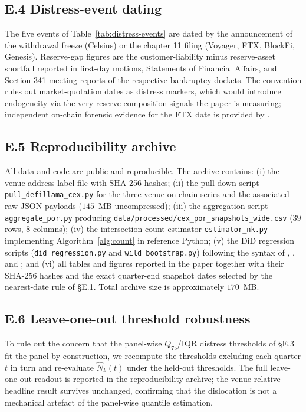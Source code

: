 \subsection*{E.4 Distress-event dating}

The five events of Table~\ref{tab:distress-events} are dated by
the announcement of the withdrawal freeze (Celsius) or the
chapter 11 filing (Voyager, FTX, BlockFi, Genesis).
Reserve-gap figures are the customer-liability minus reserve-asset
shortfall reported in first-day motions, Statements of Financial
Affairs, and Section 341 meeting reports of the respective
bankruptcy dockets. The convention rules out market-quotation
dates as distress markers, which would introduce endogeneity via
the very reserve-composition signals the paper is measuring;
independent on-chain forensic evidence for the FTX date is
provided by \citet{Griffin-Kruger-Mei2023}.

\subsection*{E.5 Reproducibility archive}

All data and code are public and reproducible. The archive
contains:
(i) the venue-address label file with SHA-256 hashes;
(ii) the pull-down script \texttt{pull\_defillama\_cex.py} for the
three-venue on-chain series and the associated raw JSON payloads
($145$~MB uncompressed);
(iii) the aggregation script \texttt{aggregate\_por.py} producing
\texttt{data/processed/cex\_por\_snapshots\_wide.csv} (39 rows,
8 columns);
(iv) the intersection-count estimator \texttt{estimator\_nk.py}
implementing Algorithm~\ref{alg:count} in reference Python;
(v) the DiD regression scripts (\texttt{did\_regression.py} and
\texttt{wild\_bootstrap.py}) following the syntax of
\citet{Callaway-SantAnna2021}, \citet{Sun-Abraham2021}, and
\citet{Borusyak2024}; and
(vi) all tables and figures reported in the paper together with
their SHA-256 hashes and the exact quarter-end snapshot dates
selected by the nearest-date rule of \S E.1. Total archive size
is approximately $170$~MB.

\subsection*{E.6 Leave-one-out threshold robustness}

To rule out the concern that the panel-wise $Q_{75}$/IQR distress
thresholds of \S E.3 fit the panel by construction, we recompute
the thresholds excluding each quarter $t$ in turn and re-evaluate
$\hat N_k(t)$ under the held-out thresholds. The full leave-one-out
readout is reported in the reproducibility archive; the
venue-relative headline result survives unchanged, confirming that
the dislocation is not a mechanical artefact of the panel-wise
quantile estimation.


